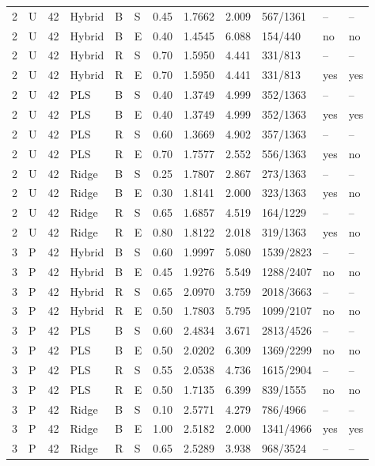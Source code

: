\documentclass[10pt,a4paper]{article}
\begin{document}
\begin{longtable}{rlrlllrrrlll}
2 & U & 42 & Hybrid & B & S & 0.45 & 1.7662 & 2.009 & 567/1361 & -- & -- \\
2 & U & 42 & Hybrid & B & E & 0.40 & 1.4545 & 6.088 & 154/440 & no & no \\
2 & U & 42 & Hybrid & R & S & 0.70 & 1.5950 & 4.441 & 331/813 & -- & -- \\
2 & U & 42 & Hybrid & R & E & 0.70 & 1.5950 & 4.441 & 331/813 & yes & yes \\
2 & U & 42 & PLS & B & S & 0.40 & 1.3749 & 4.999 & 352/1363 & -- & -- \\
2 & U & 42 & PLS & B & E & 0.40 & 1.3749 & 4.999 & 352/1363 & yes & yes \\
2 & U & 42 & PLS & R & S & 0.60 & 1.3669 & 4.902 & 357/1363 & -- & -- \\
2 & U & 42 & PLS & R & E & 0.70 & 1.7577 & 2.552 & 556/1363 & yes & no \\
2 & U & 42 & Ridge & B & S & 0.25 & 1.7807 & 2.867 & 273/1363 & -- & -- \\
2 & U & 42 & Ridge & B & E & 0.30 & 1.8141 & 2.000 & 323/1363 & yes & no \\
2 & U & 42 & Ridge & R & S & 0.65 & 1.6857 & 4.519 & 164/1229 & -- & -- \\
2 & U & 42 & Ridge & R & E & 0.80 & 1.8122 & 2.018 & 319/1363 & yes & no \\
3 & P & 42 & Hybrid & B & S & 0.60 & 1.9997 & 5.080 & 1539/2823 & -- & -- \\
3 & P & 42 & Hybrid & B & E & 0.45 & 1.9276 & 5.549 & 1288/2407 & no & no \\
3 & P & 42 & Hybrid & R & S & 0.65 & 2.0970 & 3.759 & 2018/3663 & -- & -- \\
3 & P & 42 & Hybrid & R & E & 0.50 & 1.7803 & 5.795 & 1099/2107 & no & no \\
3 & P & 42 & PLS & B & S & 0.60 & 2.4834 & 3.671 & 2813/4526 & -- & -- \\
3 & P & 42 & PLS & B & E & 0.50 & 2.0202 & 6.309 & 1369/2299 & no & no \\
3 & P & 42 & PLS & R & S & 0.55 & 2.0538 & 4.736 & 1615/2904 & -- & -- \\
3 & P & 42 & PLS & R & E & 0.50 & 1.7135 & 6.399 & 839/1555 & no & no \\
3 & P & 42 & Ridge & B & S & 0.10 & 2.5771 & 4.279 & 786/4966 & -- & -- \\
3 & P & 42 & Ridge & B & E & 1.00 & 2.5182 & 2.000 & 1341/4966 & yes & yes \\
3 & P & 42 & Ridge & R & S & 0.65 & 2.5289 & 3.938 & 968/3524 & -- & -- \\

\end{longtable}
\end{document}
